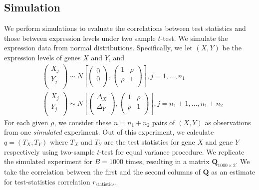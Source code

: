 \documentclass[review]{elsarticle}
\begin{document}
\subsection{Simulation}
We perform simulations to evaluate the correlations between test statistics and those between 
expression levels under two sample $t$-test. We simulate the expression data from normal 
distributions. Specifically, we let $(X, Y)$ be the expression levels of genes $X$ and $Y$, and
\begin{equation}
\begin{aligned}
&\left( \begin{array}{c}
X_{j}\\
Y_{j}\\
\end{array}\right)
\sim N\left[
\left(\begin{array}{c}
0\\
0\\
\end{array} \right), 
\left(
\begin{array}{cc}
1 &\rho  \\
\rho & 	1 \\
\end{array}
\right)
\right], j = 1, \ldots, n_1 \\
& \left( \begin{array}{c}
X_{j}\\
Y_{j}\\
\end{array}\right)
\sim N\left[
\left(\begin{array}{c}
\Delta_X\\
\Delta_Y\\
\end{array} \right), 
\left(
\begin{array}{cc}
1 &\rho \\
\rho  & 	1 \\
\end{array}
\right)
\right], j = n_1 +1, \ldots, n_1 + n_2 
\end{aligned}
\end{equation}
For each given $\rho$, we 
consider these $n=n_1 + n_2$ pairs of $(X, Y)$
as observations from one \textit{simulated} experiment. Out of this experiment, we calculate $q 
= (T_X, T_Y)$ where $T_X$ and $T_Y$ are the test statistics for gene $X$ and gene $Y$ 
respectively using 
two-sample $t$-test for equal variance procedure. We replicate the simulated
experiment for $B=1000$ times, resulting in a matrix $\bm Q_{1000\times 2}$. We take the 
correlation between the first and the second columns of $\bm Q$ as an estimate for test-statistics 
correlation	$r_\text{statistics}$. 
\end{document}
